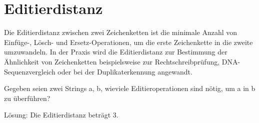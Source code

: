 \section{Editierdistanz}
Die Editierdistanz zwischen zwei Zeichenketten ist die minimale Anzahl von Einfüge-, Lösch- und Ersetz-Operationen, um die erste Zeichenkette in die zweite umzuwandeln.
In der Praxis wird die Editierdistanz zur Bestimmung der Ähnlichkeit von Zeichenketten beispielsweise zur Rechtschreibprüfung, DNA-Sequenzvergleich oder bei der Duplikaterkennung angewandt.

Gegeben seien zwei Strings a, b, wieviele Editieroperationen sind nötig, um a in b zu überführen?
\begin{figure}[htbp]
	\begin{center}
	\end{center}
\end{figure}
Lösung: Die Editierdistanz beträgt 3.

